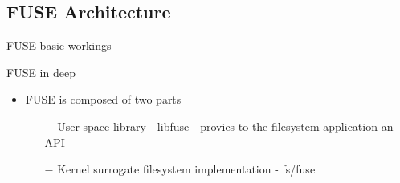 \documentclass{beamer}
\begin{document}
\subsection{FUSE Architecture}

\begin{frame}{FUSE basic workings}
	
	
	\let\thefootnote\relax{}
	
\end{frame}

\begin{frame}{FUSE in deep}
	
	\begin{itemize}[<+->]

		\item{FUSE is composed of two parts}
			\begin{itemize}
				\item[$-$]{User space library - libfuse - provies to the filesystem application an API}
				\item[$-$]{Kernel surrogate filesystem implementation - fs/fuse }
			\end{itemize}	
	
	\end{itemize}
	
\end{frame}
\end{document}
